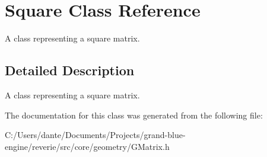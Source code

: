 \hypertarget{class_square}{}\section{Square Class Reference}
\label{class_square}


A class representing a square matrix.  




\subsection{Detailed Description}
A class representing a square matrix. 

The documentation for this class was generated from the following file\+:\begin{DoxyCompactItemize}
\item 
C\+:/\+Users/dante/\+Documents/\+Projects/grand-\/blue-\/engine/reverie/src/core/geometry/G\+Matrix.\+h\end{DoxyCompactItemize}
